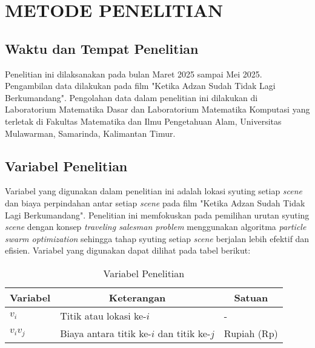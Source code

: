 \renewcommand{\thechapter}{\Roman{chapter}}
\chapter{METODE PENELITIAN}\label{babTiga}
\renewcommand{\thechapter}{\arabic{chapter}}
\vspace{8mm}

\section{Waktu dan Tempat Penelitian}
\vspace{-4mm}
{\frenchspacing
    Penelitian ini dilaksanakan pada bulan Maret 2025 sampai Mei 2025.
    Pengambilan data dilakukan pada film "Ketika Adzan Sudah Tidak Lagi Berkumandang".
    Pengolahan data dalam penelitian ini dilakukan di Laboratorium Matematika Dasar dan Laboratorium Matematika Komputasi yang terletak di
    Fakultas Matematika dan Ilmu Pengetahuan Alam, Universitas Mulawarman, Samarinda, Kalimantan Timur.
}
\vspace{-10mm}

\section{Variabel Penelitian}
\vspace{-4mm}
{\frenchspacing
    Variabel yang digunakan dalam penelitian ini adalah lokasi syuting setiap \textit{scene} dan biaya perpindahan antar setiap \textit{scene} pada film
    "Ketika Adzan Sudah Tidak Lagi Berkumandang".
    Penelitian ini memfokuskan pada pemilihan urutan syuting \textit{scene} dengan konsep \textit{traveling salesman problem} menggunakan algoritma \textit{particle swarm optimization} sehingga tahap syuting setiap \textit{scene} berjalan lebih efektif dan efisien.
    Variabel yang digunakan dapat dilihat pada tabel berikut:

    \begin{table}
        \centering
        \caption{Variabel Penelitian}
        \label{tab: variabel penelitian}
        \begin{tabular}{|l|l|l|}
            \hline
            \multicolumn{1}{|c|}{\textbf{Variabel}} & \multicolumn{1}{c|}{\textbf{Keterangan}}   & \multicolumn{1}{c|}{\textbf{Satuan}} \\ \hline
            $v_{i}$                                 & Titik atau lokasi ke-$i$                   & -                                    \\ \hline
            $v_{i}v_{j}$                            & Biaya antara titik ke-$i$ dan titik ke-$j$ & Rupiah (Rp)                          \\ \hline
        \end{tabular}
    \end{table}
}
\vspace{-3mm}

